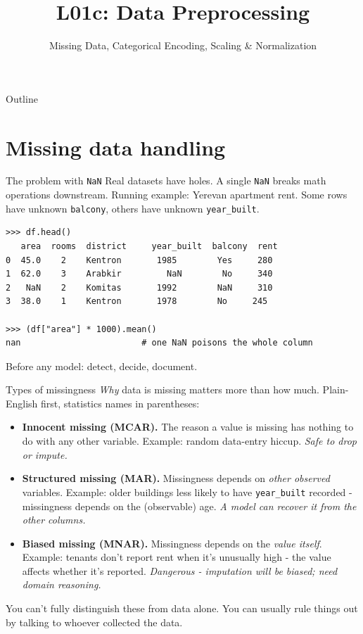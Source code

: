 \documentclass[aspectratio=169]{beamer}
\title{L01c: Data Preprocessing}
\subtitle{Missing Data, Categorical Encoding, Scaling \& Normalization}
\date{}
\begin{document}
\begin{frame}{Outline}
  \tableofcontents
\end{frame}

\section{Missing data handling}

\begin{frame}[fragile]{The problem with \texttt{NaN}}
  Real datasets have holes. A single \texttt{NaN} breaks math operations downstream.
  \vfill
  Running example: Yerevan apartment rent. Some rows have unknown \texttt{balcony}, others have unknown \texttt{year\_built}.
  \vfill
\begin{lstlisting}
>>> df.head()
   area  rooms  district     year_built  balcony  rent
0  45.0    2    Kentron       1985        Yes     280
1  62.0    3    Arabkir         NaN        No     340
2   NaN    2    Komitas       1992        NaN     310
3  38.0    1    Kentron       1978        No     245

>>> (df["area"] * 1000).mean()
nan                        # one NaN poisons the whole column
\end{lstlisting}
  \vfill
  Before any model: detect, decide, document.
\end{frame}

\begin{frame}{Types of missingness}
  \emph{Why} data is missing matters more than how much. Plain-English first, statistics names in parentheses:
  \vfill
  \begin{itemize}
    \item \textbf{Innocent missing (MCAR).} The reason a value is missing has nothing to do with any other variable. Example: random data-entry hiccup. \textit{Safe to drop or impute.}
    \item \textbf{Structured missing (MAR).} Missingness depends on \emph{other observed} variables. Example: older buildings less likely to have \texttt{year\_built} recorded - missingness depends on the (observable) age. \textit{A model can recover it from the other columns.}
    \item \textbf{Biased missing (MNAR).} Missingness depends on the \emph{value itself}. Example: tenants don't report rent when it's unusually high - the value affects whether it's reported. \textit{Dangerous - imputation will be biased; need domain reasoning.}
  \end{itemize}
  \vfill
  You can't fully distinguish these from data alone. You can usually rule things out by talking to whoever collected the data.
\end{frame}
\end{document}
